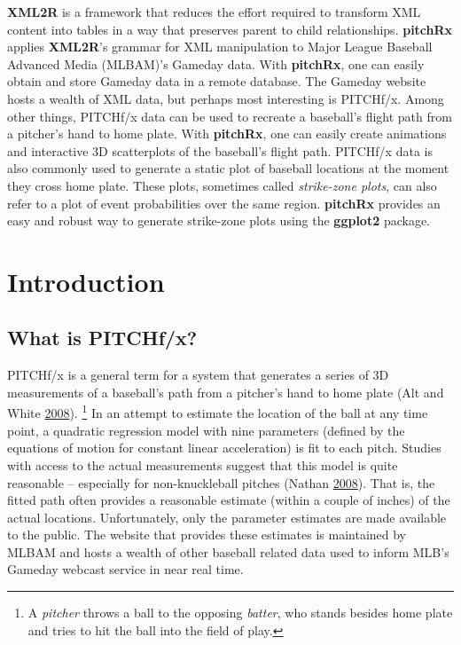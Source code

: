 \documentclass[12pt,]{isuthesis}
\let\rmarkdownfootnote\footnote%
\def\footnote{\protect\rmarkdownfootnote}
\begin{document}
\textbf{XML2R} is a framework that reduces the effort required to
transform XML content into tables in a way that preserves parent to
child relationships. \textbf{pitchRx} applies \textbf{XML2R}'s grammar
for XML manipulation to Major League Baseball Advanced Media (MLBAM)'s
Gameday data. With \textbf{pitchRx}, one can easily obtain and store
Gameday data in a remote database. The Gameday website hosts a wealth of
XML data, but perhaps most interesting is PITCHf/x. Among other things,
PITCHf/x data can be used to recreate a baseball's flight path from a
pitcher's hand to home plate. With \textbf{pitchRx}, one can easily
create animations and interactive 3D scatterplots of the baseball's
flight path. PITCHf/x data is also commonly used to generate a static
plot of baseball locations at the moment they cross home plate. These
plots, sometimes called \textit{strike-zone plots}, can also refer to a
plot of event probabilities over the same region. \textbf{pitchRx}
provides an easy and robust way to generate strike-zone plots using the
\textbf{ggplot2} package.

\section{Introduction}\label{introduction}

\subsection{What is PITCHf/x?}\label{what-is-pitchfx}

PITCHf/x is a general term for a system that generates a series of 3D
measurements of a baseball's path from a pitcher's hand to home plate
(Alt and White \protect\hyperlink{ref-patent}{2008}).
\footnote{A \textit{pitcher} throws a ball to the opposing \textit{batter}, who
stands besides home plate and tries to hit the ball into the field
of play.
} In an attempt to estimate the location of the ball at any time point,
a quadratic regression model with nine parameters (defined by the
equations of motion for constant linear acceleration) is fit to each
pitch. Studies with access to the actual measurements suggest that this
model is quite reasonable -- especially for non-knuckleball pitches
(Nathan \protect\hyperlink{ref-trajecoryAnalysis}{2008}). That is, the
fitted path often provides a reasonable estimate (within a couple of
inches) of the actual locations. Unfortunately, only the parameter
estimates are made available to the public. The website that provides
these estimates is maintained by MLBAM and hosts a wealth of other
baseball related data used to inform MLB's Gameday webcast service in
near real time.
\end{document}
